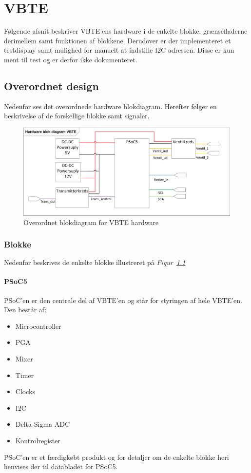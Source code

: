 \chapter{VBTE}
Følgende afsnit beskriver VBTE'ens hardware i de enkelte blokke, grænsefladerne derimellem samt funktionen af blokkene. Derudover er der implementeret et testdisplay samt mulighed for manuelt at indstille I2C adressen. Disse er kun ment til test og er derfor ikke dokumenteret.
\section{Overordnet design}
Nedenfor ses det overordnede hardware blokdiagram. Herefter følger en beskrivelse af de forskellige blokke samt signaler.
\begin{figure}[H]
\centering
\includegraphics[width=1\textwidth]{billeder/HWVBTE}
\caption{Overordnet blokdiagram for VBTE hardware}
\label{fig:HWVBTE}
\end{figure}
\subsection{Blokke}
Nedenfor beskrives de enkelte blokke illustreret på \textit{Figur~\ref{fig:HWVBTE}}
\subsubsection{PSoC5}
PSoC'en er den centrale del af VBTE'en og står for styringen af hele VBTE'en. Den består af:
\begin{itemize}
\item Microcontroller
\item PGA
\item Mixer
\item Timer
\item Clocks
\item I2C
\item Delta-Sigma ADC
\item Kontrolregister
\end{itemize}
PSoC'en er et færdigkøbt produkt og for detaljer om de enkelte blokke heri henvises der til databladet for PSoC5.

